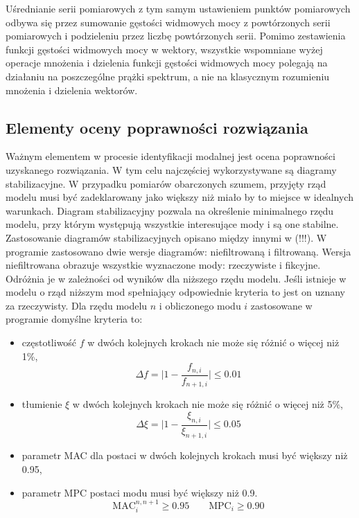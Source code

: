 Uśrednianie serii pomiarowych z tym samym ustawieniem punktów pomiarowych odbywa się przez sumowanie gęstości widmowych mocy z powtórzonych serii pomiarowych i podzieleniu przez liczbę powtórzonych serii. Pomimo zestawienia funkcji gęstości widmowych mocy w wektory, wszystkie wspomniane wyżej operacje mnożenia i dzielenia funkcji gęstości widmowych mocy polegają na działaniu na poszczególne prążki spektrum, a nie na klasycznym rozumieniu mnożenia i dzielenia wektorów. 

\subsection{Elementy oceny poprawności rozwiązania}
Ważnym elementem w procesie identyfikacji modalnej jest ocena poprawności uzyskanego rozwiązania. W tym celu najczęściej wykorzystywane są diagramy stabilizacyjne. W przypadku pomiarów obarczonych szumem, przyjęty rząd modelu musi być zadeklarowany jako większy niż miało by to miejsce w idealnych warunkach. Diagram stabilizacyjny pozwala na określenie minimalnego rzędu modelu, przy którym występują wszystkie interesujące mody i są one stabilne. Zastosowanie diagramów stabilizacyjnych opisano między innymi w (!!!). W programie zastosowano dwie wersje diagramów: niefiltrowaną i filtrowaną. Wersja niefiltrowana obrazuje wszystkie wyznaczone mody: rzeczywiste i fikcyjne. Odróżnia je w zależności od wyników dla niższego rzędu modelu. Jeśli istnieje w modelu o rząd niższym mod spełniający odpowiednie kryteria to jest on uznany za rzeczywisty. Dla rzędu modelu $n$ i obliczonego modu $i$ zastosowane w programie domyślne kryteria to:
\begin{itemize}
	\item częstotliwość $f$ w dwóch kolejnych krokach nie może się różnić o więcej niż 1\%,
	\begin{equation}\label{eq: stabdiag_crit_freq}
		\Delta f =  \Big| 1-\frac{f_{n,i}}{f_{n+1,i}}\Big|  \le 0.01
	\end{equation}
	\item tłumienie $\xi$ w dwóch kolejnych krokach nie może się różnić o więcej niż 5\%,
		\begin{equation}\label{eq: stabdiag_crit_ksi}
		\Delta \xi =  \Big| 1-\frac{\xi_{n,i}}{\xi_{n+1,i}}\Big|  \le 0.05
	\end{equation}
	\item parametr MAC dla postaci w dwóch kolejnych krokach musi być większy niż 0.95,	
	\item parametr MPC postaci modu musi być większy niż 0.9.
	\begin{equation}\label{eq: stabdiag_crit_MPC_MAC}
		\text{MAC}_i^{n,n+1} \ge 0.95 \qquad \text{MPC}_i \ge 0.90
	\end{equation}
\end{itemize}
